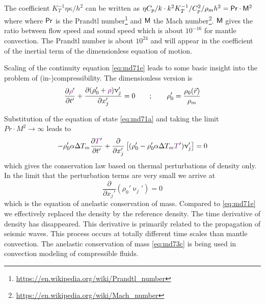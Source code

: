 The coefficient $K_T^{-1}\eta \kappa/h^2$ can be written as 
$\eta C_p/k \cdot k^2 K_T^{-1}/C_p^2/\rho_m h^2 = {\mathsf{Pr}} \cdot {\mathsf{M}}^2$
where where ${\mathsf{Pr}}$ is the
Prandtl number\footnote{\url{https://en.wikipedia.org/wiki/Prandtl_number}} 
and ${\mathsf{M}}$ the Mach number\footnote{\url{https://en.wikipedia.org/wiki/Mach_number}}. 
${\mathsf{M}}$ gives the ratio between flow speed and
sound speed which is about $10^{-16}$ for mantle convection. The Prandtl number is about $10^{24}$
and will appear in the coefficient of the inertial term of the dimensionless equation of
motion.

Scaling of the continuity equation \eqref{eq:md71e} leads to some basic insight into the problem of
(in-)compressibility. The dimensionless version is
\begin{equation}
\frac{\partial {\color{violet}\rho}'}{\partial t'} + 
\frac{\partial (\rho_0' + {\color{violet}\rho})\upnu_j'  }{\partial x_j'} = 0
\qquad
; \qquad
\rho_0' = \frac{\rho_0(\vec{r})}{\rho_m}
\label{eq:md73a}
\end{equation}

\vspace{0.5cm}


\vspace{0.5cm}

Substitution of the equation of state \eqref{eq:md71a} 
and taking the limit $Pr \cdot M^2 \rightarrow \infty$ leads to
\begin{equation}
-\rho_0' \alpha \Delta T_m \frac{\partial {\color{violet} T}'  }{\partial t'} + 
\frac{\partial }{\partial x_j'} 
\left[
(\rho_0' - \rho_0' \alpha \Delta T_m {\color{violet} T}') \upnu_j'
\right] = 0
\label{eq:md73b}
\end{equation}
which gives the conservation law based on thermal perturbations of density only. In the
limit that the perturbation terms are very small we arrive at
\begin{equation}
\frac{\partial }{\partial x_j'} ( \rho_0' \upnu_j' ) =0
\label{eq:md73c}
\end{equation}
which is the equation of anelastic conservation of mass. Compared to \eqref{eq:md71e} we
effectively replaced the density by the reference density. The time derivative of density
has disappeared. This derivative is primarily related to the propagation of seismic waves.
This process occurs at totally different time scales than mantle convection. The anelastic
conservation of mass \eqref{eq:md73c} is being used in convection modeling of compressible fluids.


